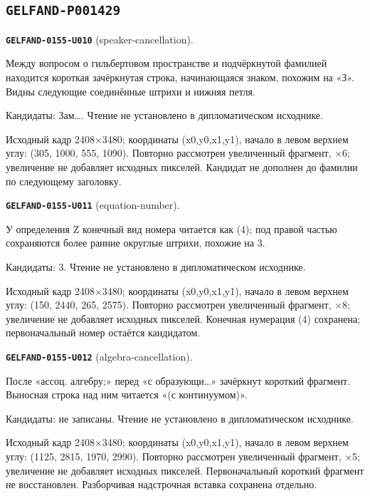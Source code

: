 \subsection*{\texttt{GELFAND-P001429}}
\par\noindent\leavevmode{}\label{GELFAND-0155-U010}\label{GELFAND-P001429:speaker-cancellation}\textbf{\texttt{GELFAND-0155-U010}} (speaker-cancellation).\nopagebreak[4]\par
Между вопросом о гильбертовом пространстве и подчёркнутой фамилией находится короткая зачёркнутая строка, начинающаяся знаком, похожим на «З». Видны следующие соединённые штрихи и нижняя петля.\par
Кандидаты: Зам…. Чтение не установлено в дипломатическом исходнике.\par
Исходный кадр 2408×3480; координаты (x0,y0,x1,y1), начало в левом верхнем углу: (305, 1000, 555, 1090). Повторно рассмотрен увеличенный фрагмент, ×6; увеличение не добавляет исходных пикселей. Кандидат не дополнен до фамилии по следующему заголовку.\par
\medskip
\par\noindent\leavevmode{}\label{GELFAND-0155-U011}\label{GELFAND-P001429:equation-number}\textbf{\texttt{GELFAND-0155-U011}} (equation-number).\nopagebreak[4]\par
У определения Z конечный вид номера читается как (4); под правой частью сохраняются более ранние округлые штрихи, похожие на 3.\par
Кандидаты: 3. Чтение не установлено в дипломатическом исходнике.\par
Исходный кадр 2408×3480; координаты (x0,y0,x1,y1), начало в левом верхнем углу: (150, 2440, 265, 2575). Повторно рассмотрен увеличенный фрагмент, ×8; увеличение не добавляет исходных пикселей. Конечная нумерация (4) сохранена; первоначальный номер остаётся кандидатом.\par
\medskip
\par\noindent\leavevmode{}\label{GELFAND-0155-U012}\label{GELFAND-P001429:algebra-cancellation}\textbf{\texttt{GELFAND-0155-U012}} (algebra-cancellation).\nopagebreak[4]\par
После «ассоц. алгебру;» перед «с образующи…» зачёркнут короткий фрагмент. Выносная строка над ним читается «(с континуумом)».\par
Кандидаты: не записаны. Чтение не установлено в дипломатическом исходнике.\par
Исходный кадр 2408×3480; координаты (x0,y0,x1,y1), начало в левом верхнем углу: (1125, 2815, 1970, 2990). Повторно рассмотрен увеличенный фрагмент, ×5; увеличение не добавляет исходных пикселей. Первоначальный короткий фрагмент не восстановлен. Разборчивая надстрочная вставка сохранена отдельно.\par

